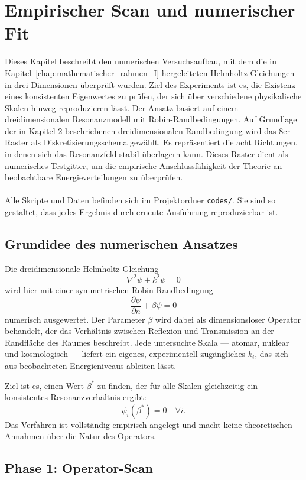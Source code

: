 \chapter{Empirischer Scan und numerischer Fit}
\label{chap:empirischer_fit}

Dieses Kapitel beschreibt den numerischen Versuchsaufbau, mit dem die in Kapitel~\ref{chap:mathematischer_rahmen_I}
hergeleiteten Helmholtz-Gleichungen in drei Dimensionen überprüft wurden.  
Ziel des Experiments ist es, die Existenz eines konsistenten Eigenwertes
zu prüfen, der sich über verschiedene physikalische Skalen hinweg reproduzieren lässt.
Der Ansatz basiert auf einem dreidimensionalen Resonanzmodell mit Robin-Randbedingungen. Auf Grundlage der in Kapitel 2 beschriebenen dreidimensionalen Randbedingung
wird das 8er-Raster als Diskretisierungsschema gewählt. Es repräsentiert die acht Richtungen, in denen sich das Resonanzfeld stabil überlagern kann. Dieses Raster dient als numerisches Testgitter, um die empirische Anschlussfähigkeit der Theorie an beobachtbare Energieverteilungen zu überprüfen.
\\
\\
Alle Skripte und Daten befinden sich im Projektordner \texttt{codes/}.  
Sie sind so gestaltet, dass jedes Ergebnis durch erneute Ausführung reproduzierbar ist.

\section{Grundidee des numerischen Ansatzes}

Die dreidimensionale Helmholtz-Gleichung
\[
  \nabla^2 \psi + k^2 \psi = 0
\]
wird hier mit einer symmetrischen Robin-Randbedingung
\[
  \frac{\partial \psi}{\partial n} + \beta \psi = 0
\]
numerisch ausgewertet.  
Der Parameter $\beta$ wird dabei als dimensionsloser Operator behandelt, der das
Verhältnis zwischen Reflexion und Transmission an der Randfläche des Raumes beschreibt.
Jede untersuchte Skala — atomar, nuklear und kosmologisch — liefert ein eigenes,
experimentell zugängliches $k_i$, das sich aus beobachteten Energieniveaus ableiten lässt.

Ziel ist es, einen Wert $\beta^*$ zu finden, der für alle Skalen gleichzeitig
ein konsistentes Resonanzverhältnis ergibt:
\[
  \psi_i(\beta^*) = 0 \quad \forall i.
\]
Das Verfahren ist vollständig empirisch angelegt und macht keine theoretischen
Annahmen über die Natur des Operators.
\\
\newpage
\section{Phase 1: Operator-Scan}
\label{sec:scan}

